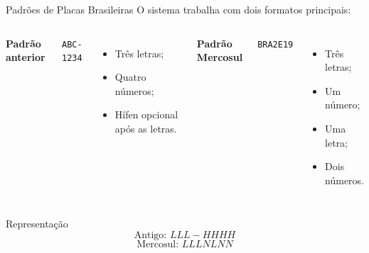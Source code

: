 \documentclass[aspectratio=169,12pt]{beamer}
\begin{document}
\begin{frame}{Padrões de Placas Brasileiras}
    \scriptsize
    O sistema trabalha com dois formatos principais:

    \vspace{0.3cm}

    \begin{columns}


        \textbf{Padrão anterior}

        \begin{center}
            \Large
            \texttt{ABC-1234}
        \end{center}

        \begin{itemize}
            \item Três letras;
            \item Quatro números;
            \item Hífen opcional após as letras.
        \end{itemize}


        \textbf{Padrão Mercosul}

        \begin{center}
            \Large
            \texttt{BRA2E19}
        \end{center}

        \begin{itemize}
            \item Três letras;
            \item Um número;
            \item Uma letra;
            \item Dois números.
        \end{itemize}

    \end{columns}

    \vspace{0.4cm}

    \begin{block}{Representação}
        \[
            \text{Antigo: } LLL-HHHH
        \]
        \[
            \text{Mercosul: } LLLNLNN
        \]
    \end{block}

\end{frame}
\end{document}
